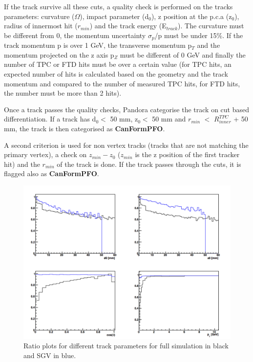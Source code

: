 If the track survive all these cuts, a quality check is performed on the tracks parameters: curvature ($\Omega$), impact parameter (d$_0$), z position at the p.c.a (z$_0$), radius of innermost hit ($r_{min}$) and the track energy (E$_{track}$). The curvature must be different from 0, the momentum uncertainty $\sigma_p$/p must be under 15\%. If the track momentum p is over 1 GeV, the transverse momentum p$_T$ and the momentum projected on the z axis p$_Z$ must be different of 0 GeV and finally the number of TPC or FTD hits must be over a certain value (for TPC hits, an expected number of hits is calculated based on the geometry and the track momentum and compared to the number of measured TPC hits, for FTD hits, the number must be more than 2 hits).

Once a track passes the quality checks, Pandora categorise the track on cut based differentiation. If a track has  d$_0 <$ 50 mm, z$_0 <$ 50 mm and $r_{min}$  $<$ $R^{TPC}_{inner}$ + 50 mm, the track is then categorised as \textbf{CanFormPFO}.

A second criterion is used for non vertex tracks (tracks that are not matching the primary vertex), a check on $z_{min} - z_0$ ($z_{min}$ is the z position of the first tracker hit) and the $r_{min}$ of the track is done. If the track passes through the cuts, it is flagged also as \textbf{CanFormPFO}.

\begin{figure}[t]
  \centering
  \includegraphics[scale=0.5]{chap6/fig_SGV/eff_track_selection_curlers.png}
  \caption{Ratio plots for different track parameters for full simulation in black and SGV in blue.}
  \label{fig:trk_select_wcurlers}
\end{figure}

